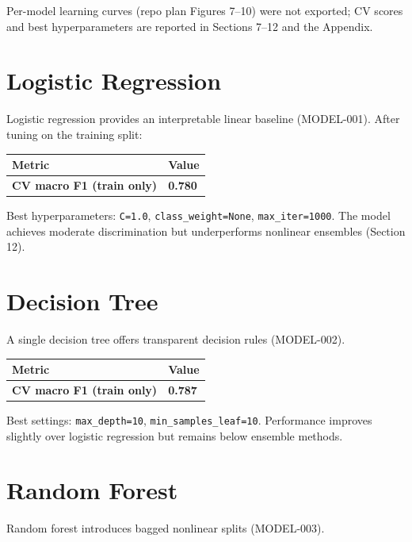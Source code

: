 ﻿\documentclass[11pt,a4paper]{article}
\begin{document}
Per-model learning curves (repo plan Figures 7–10) were not exported; CV scores and best hyperparameters are reported in Sections 7–12 and the Appendix.


\section{Logistic Regression}

Logistic regression provides an interpretable linear baseline (MODEL-001). After tuning on the training split:

\begin{table}[H]
  \centering
  \small
  \begin{tabular}{ll}
    \toprule
    Metric & Value \\
    \midrule
    \textbf{CV macro F1 (train only)} & \textbf{0.780} \\
    \bottomrule
  \end{tabular}
\end{table}

Best hyperparameters: \texttt{C=1.0}, \texttt{class\_weight=None}, \texttt{max\_iter=1000}. The model achieves moderate discrimination but underperforms nonlinear ensembles (Section 12).


\section{Decision Tree}

A single decision tree offers transparent decision rules (MODEL-002).

\begin{table}[H]
  \centering
  \small
  \begin{tabular}{ll}
    \toprule
    Metric & Value \\
    \midrule
    \textbf{CV macro F1 (train only)} & \textbf{0.787} \\
    \bottomrule
  \end{tabular}
\end{table}

Best settings: \texttt{max\_depth=10}, \texttt{min\_samples\_leaf=10}. Performance improves slightly over logistic regression but remains below ensemble methods.


\section{Random Forest}

Random forest introduces bagged nonlinear splits (MODEL-003).
\end{document}

